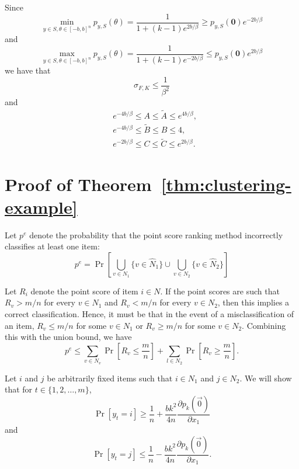 Since 
$$
\min_{y\in S,\theta\in [-b,b]^n} p_{y,S}(\theta) 
= \frac{1}{1+(k-1)e^{2b/\beta}}
\ge p_{y,S}({\bm 0}) e^{-2b/\beta}
$$
and
$$
\max_{y\in S,\theta\in [-b,b]^n} p_{y,S}(\theta) 
= \frac{1}{1+(k-1)e^{-2b/\beta}}
\le p_{y,S}({\bm 0}) e^{2b/\beta}
$$
we have that 
$$
\sigma_{F,K} \le \frac{1}{\beta^2}
$$
and
\begin{align}
&e^{-4b/\beta}\le A \le \widetilde{A} \le e^{4b/\beta}, \\
&e^{-4b/\beta}\le \widetilde{B} \le B \le 4,\\
&e^{-2b/\beta}\le C \le \widetilde{C} \le e^{2b/\beta}.
\end{align}



\section{Proof of Theorem~\ref{thm:clustering-example}}
\label{sec:clustering-example}

Let $p^e$ denote the probability that the point score ranking method incorrectly classifies at least one item: 
$$
p^e = \Pr\left[\bigcup_{v\in N_1} \{v\in \widehat N_1\} \cup \bigcup_{v\in N_2} \{v\in \widehat N_2\}\right]
$$

Let $R_i$ denote the point score of item $i\in N$. If the point scores are such that $R_v > m/n$ for every $v\in N_1$ and $R_v < m/n$ for every $v\in N_2$, then this implies a correct classification. Hence, it must be that in the event of a misclassification of an item, $R_v \leq m/n$ for some $v\in N_1$ or $R_v \geq m/n$ for some $v\in N_2$. Combining this with the union bound, we have
\begin{equation}
p^e 
\leq \sum_{v\in N_v}\Pr\left[R_v \leq \frac{m}{n}\right] + \sum_{l\in N_2}\Pr\left[R_v \geq \frac{m}{n}\right].
\label{equ:tobound}
\end{equation}

Let $i$ and $j$ be arbitrarily fixed items such that $i\in N_1$ and $j\in N_2$. We will show that for $t\in \{1,2,\ldots,m\}$,
\begin{equation}
\Pr[y_t = i] \geq \frac{1}{n} + \frac{bk^2}{4n}\frac{\partial p_k(\vec{0})}{\partial x_1}
\label{equ:yti}
\end{equation}
and
\begin{equation}
\Pr[y_t = j] \leq \frac{1}{n} - \frac{bk^2}{4n}\frac{\partial p_k(\vec{0})}{\partial x_1}.
\label{equ:ytj}
\end{equation}

